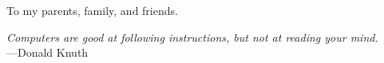 %
\begin{frontmatter}

%
%
\makefrontmatter 

%
%   
%
%
%
%
\begin{dedication} 
	To my parents, family, and friends.
\end{dedication}

%   
%



%
%

\begin{epigraph} 
  \emph{Computers are good at following instructions, but not at reading your mind. }\\
  ---Donald Knuth

    \vspace{2.3in}

\end{epigraph}

%
\tableofcontents

\renewcommand{\glossarysection}[2][]{
\newpage
\noindent
\centerline{LIST OF ABBREVIATIONS}
\addcontentsline{toc}{chapter}{List of Abbreviations}
}


\end{frontmatter}
